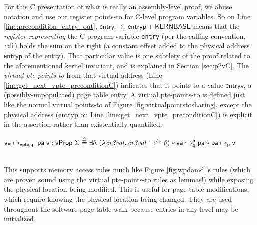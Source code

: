 For this C presentation of what is really an assembly-level proof, we abuse notation and
use our register points-to for C-level program variables. So on Line \ref{line:precondition_entry_out},
$\mathsf{entry} \mapsto_r \mathsf{entryp+KERNBASE}$ means that the \emph{register representing} the C program variable
\lstinline|entry| (per the calling convention, \lstinline|rdi|) holds the sum on the right (a constant offset added to the physical address $\mathsf{entryp}$ of the entry).
That particular value is one subtlety of the proof related to the aforementioned kernel invariant, and is explained in Section \ref{sec:p2vC}.
The \emph{virtual pte-points-to} from that virtual address (Line \ref{line:get_next_vpte_preconditionC}) indicates that it points to a value
$\mathsf{entryv}$, a (possibly-unpopulated) page table entry.
A virtual pte-points-to is defined just like the normal virtual points-to of Figure \ref{fig:virtualpointstosharing},
except the physical address (\textsf{entryp} on Line \ref{line:get_next_vpte_preconditionC}) is explicit in the assertion
rather than existentially quantified:\\
\centerline{$
    \vaddr\mapsto_{\textsf{vpte,q}} \; \paddr \; \vpage : \mathsf{vProp}~\Sigma \stackrel{\triangle}{=} 
    \exists \delta\ldotp
	(\lambda \mathit{cr3val}\ldotp
	\ghostmaptoken{\delta{}s}{\mathit{cr3val}}{\delta}) \ast 
  \fracghostmaptoken{\delta}{\vaddr}{\paddr}{\qfrac} \ast \paddr \mapsto_{\mathsf{p}} \vpage
$}\\
This supports memory access rules much like Figure \ref{fig:wpdamd}'s rules (which are proven
sound using the virtual pte-points-to rules as lemmas!)
while exposing the physical location being modified.
This is useful for page table modifications, which require knowing the physical location being changed.
They are used throughout the software page table walk because entries in any level may be initialized.

